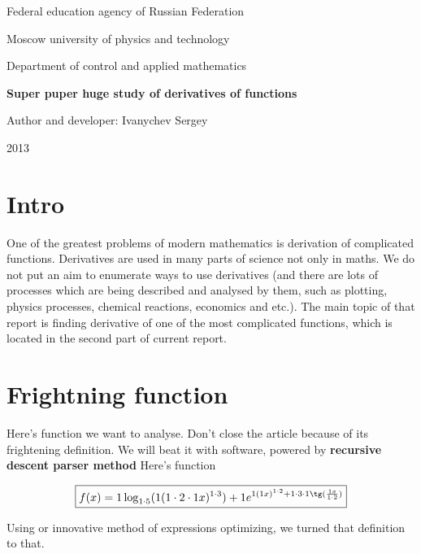 \documentclass[a4paper, 12pt]{report}
\begin{document}
\begin{titlepage}

\begin{center}
\large{}Federal education agency of Russian Federation

\Large{}Moscow university of physics and technology
\vspace{1.5cm}

Department of control and applied mathematics


\vspace{6cm}
{\bfseries{}\Huge{}Super puper huge study of derivatives of functions}
\vspace{3cm}

{\mdseries{}\large{}Author and developer: Ivanychev Sergey}


\vspace{\fill}
{\rmfamily{}\large{}2013}
\end{center}


\end{titlepage}

\chapter{Intro}

One of the greatest problems of modern mathematics is derivation of complicated functions.
Derivatives are used in many parts of science not only in maths.
We do not put an aim to enumerate ways to use derivatives (and there are lots of processes which are being described and analysed by them, such as plotting, physics processes, chemical reactions, economics and etc.).
The main topic of that report is finding derivative of one of the most complicated functions, which is located in the second part of current report.

\chapter{Frightning function} 

Here's function we want to analyse.
Don't close the article because of its frightening definition.
We will beat it with software, powered by {\bfseries{}recursive descent parser method}
Here's function

$$
\boxed{
f(x) = 
1\log_{1 \cdot 5}(1(1 \cdot 2 \cdot 1x)^{1 \cdot 3}) + 1e^{1(1x)^{1 \cdot 2} + 1 \cdot 3 \cdot 1\tg(\frac{1x}{1 \cdot 2})}
}
$$

Using or innovative method of expressions optimizing, we turned that definition to that.
\end{document}
